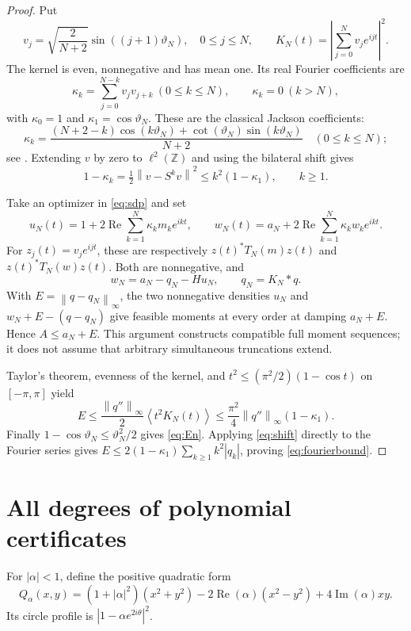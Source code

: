 \documentclass[11pt,a4paper]{article}
\theoremstyle{remark}\newtheorem{remark}[theorem]{Remark}
\newcommand{\av}[1]{\left\langle #1\right\rangle}
\newcommand{\Rea}{\operatorname{Re}}
\newcommand{\Ima}{\operatorname{Im}}
\newcommand{\norm}[1]{\left\lVert #1\right\rVert}
\begin{document}
\begin{proof}
Put
\[
 v_j=\sqrt{\frac2{N+2}}\sin((j+1)\vartheta_N),\quad 0\leq j\leq N,
 \qquad K_N(t)=\left|\sum_{j=0}^N v_j e^{ijt}\right|^2.
\]
The kernel is even, nonnegative and has mean one. Its real Fourier
coefficients are
\[
 \kappa_k=\sum_{j=0}^{N-k}v_jv_{j+k}\ (0\leq k\leq N),
 \qquad \kappa_k=0\ (k>N),
\]
with \(\kappa_0=1\) and \(\kappa_1=\cos\vartheta_N\).
These are the classical Jackson coefficients:
\begin{equation}\label{eq:jackson}
 \kappa_k=
 \frac{(N+2-k)\cos(k\vartheta_N)+
       \cot(\vartheta_N)\sin(k\vartheta_N)}{N+2}
 \quad(0\leq k\leq N);
\end{equation}
see \cite[eq.~(2.11)]{jackson}.
Extending \(v\) by zero to \(\ell^2(\mathbb Z)\) and using the bilateral
shift gives
\begin{equation}\label{eq:shift}
 1-\kappa_k=\tfrac12\norm{v-S^kv}^2
 \leq k^2(1-\kappa_1),\qquad k\geq1.
\end{equation}

Take an optimizer in \eqref{eq:sdp} and set
\[
 u_N(t)=1+2\Rea\sum_{k=1}^N\kappa_k m_k e^{ikt},\qquad
 w_N(t)=a_N+2\Rea\sum_{k=1}^N\kappa_k w_k e^{ikt}.
\]
For \(z_j(t)=v_j e^{ijt}\), these are respectively
\(z(t)^*T_N(m)z(t)\) and \(z(t)^*T_N(w)z(t)\).
Both are nonnegative, and
\[
 w_N=a_N-q_N-Hu_N,\qquad q_N=K_N*q.
\]
With \(E=\norm{q-q_N}_\infty\), the two nonnegative densities
\(u_N\) and \(w_N+E-(q-q_N)\) give feasible moments at every
order at damping \(a_N+E\). Hence \(A\leq a_N+E\). This argument
constructs compatible full moment sequences; it does not assume
that arbitrary simultaneous truncations extend.

Taylor's theorem, evenness of the kernel, and
\(t^2\leq(\pi^2/2)(1-\cos t)\) on \([-\pi,\pi]\) yield
\[
 E\leq\frac{\norm{q''}_\infty}{2}\av{t^2K_N(t)}
 \leq\frac{\pi^2}{4}\norm{q''}_\infty(1-\kappa_1).
\]
Finally \(1-\cos\vartheta_N\leq\vartheta_N^2/2\) gives
\eqref{eq:En}. Applying \eqref{eq:shift} directly to the Fourier
series gives
\(E\leq2(1-\kappa_1)\sum_{k\geq1}k^2|q_k|\), proving
\eqref{eq:fourierbound}.
\end{proof}

\section{All degrees of polynomial certificates}
For \(|\alpha|<1\), define the positive quadratic form
\begin{equation}\label{eq:quad}
 Q_\alpha(x,y)=(1+|\alpha|^2)(x^2+y^2)
 -2\Rea(\alpha)(x^2-y^2)+4\Ima(\alpha)xy.
\end{equation}
Its circle profile is \(|1-\alpha e^{2i\theta}|^2\).
\end{document}
